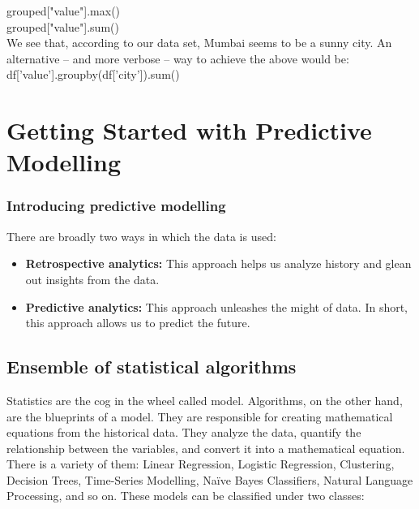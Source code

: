 \documentclass{article}
\numberwithin{equation}{section} %
\begin{document}
grouped["value"].max() \\

grouped["value"].sum() \\

We see that, according to our data set, Mumbai seems to be a sunny city. An
alternative – and more verbose – way to achieve the above would be: \\

df['value'].groupby(df['city']).sum() \\


\newpage

\section{Getting Started with Predictive Modelling}

\subsubsection*{Introducing predictive modelling}

There are broadly two ways in which the data is used: \\

\begin{itemize}
	\item \textbf{Retrospective analytics:} This approach helps us analyze history and glean out insights from the data.
	\item \textbf{Predictive analytics:} This approach unleashes the might of data. In short, this approach allows us to predict the future.
\end{itemize}


\subsection*{Ensemble of statistical algorithms}

Statistics are the cog in the wheel called model. Algorithms, on the other hand, are the blueprints of a model. They are responsible for creating mathematical equations from the historical data. They analyze the data, quantify the relationship between the variables, and convert it into a mathematical equation. There is a variety of them: Linear Regression, Logistic Regression, Clustering, Decision Trees, Time-Series Modelling, Naïve Bayes Classifiers, Natural Language Processing, and so on. These models can be classified under two classes: \\
\end{document}
